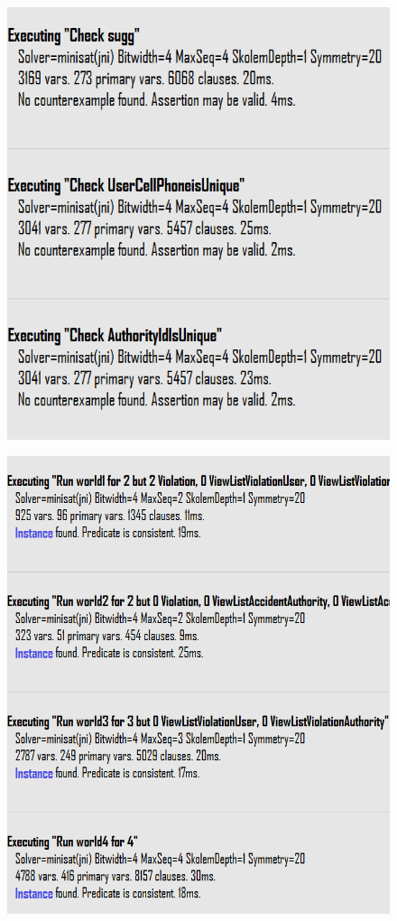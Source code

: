 \begin{figure}[h]
    \includegraphics[scale=1.1]{Images/AlloyWorlds/ExecutingChecks.PNG}
\end{figure}

\begin{figure}[H]
    \includegraphics[scale=1]{Images/AlloyWorlds/ExecutingPredicates.PNG}
\end{figure}